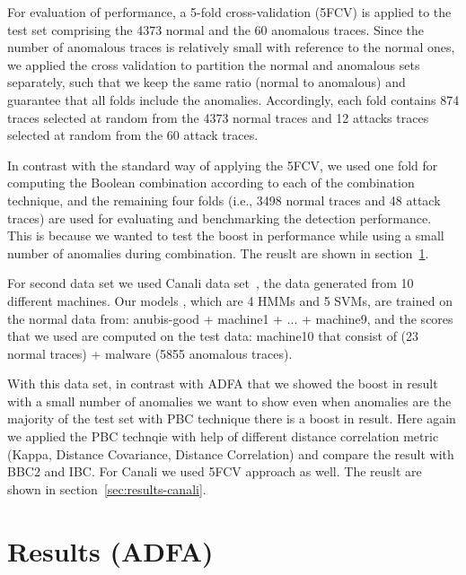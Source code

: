 For evaluation of performance, a 5-fold cross-validation (5FCV) is applied to the test set comprising the 4373 normal and the 60 anomalous traces.
Since the number of anomalous traces is relatively small with reference to the normal ones, we applied the cross validation to partition the normal and anomalous sets separately, such that we keep the same ratio (normal to anomalous) and guarantee that all folds include the anomalies.
Accordingly, each fold contains 874 traces selected at random from the 4373 normal traces and 12 attacks traces selected at random from the 60 attack traces.

In contrast with the standard way of applying the 5FCV, we used one fold for computing the Boolean combination according to each of the combination technique,
and the remaining four folds (i.e., 3498 normal traces and 48 attack traces) are used for evaluating and benchmarking the detection performance.
This is because we wanted to test the boost in performance while using a small number of anomalies during combination. The reuslt are shown in section~\ref{sec:results-ADFA}.

For second data set we used Canali data set~\cite{Canali2012}, the data generated from 10 different machines. Our models , which are 4 HMMs and 5 SVMs, are trained on the normal data from: anubis-good + machine1 + ... + machine9, and the scores that we used are computed on the test data: machine10 that consist of (23 normal traces) + malware (5855 anomalous traces).

With this data set, in contrast with ADFA that we showed the boost in result with a small number of anomalies we want to show even when  anomalies are the majority of the test set with PBC technique there is a boost in result.
Here again we applied the PBC technqie with help of different distance correlation metric (Kappa, Distance Covariance, Distance Correlation) and compare the result with BBC2 and IBC. For Canali we used 5FCV approach as well. The reuslt are shown in section~\ref{sec:results-canali}.



\section{Results (ADFA)}
\label{sec:results-ADFA}



